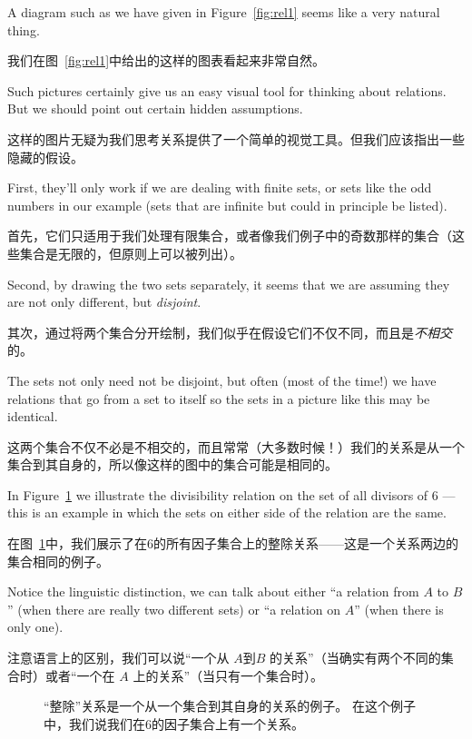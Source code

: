 A diagram such as we have given in Figure~\ref{fig:rel1} seems like a 
very natural thing.

我们在图~\ref{fig:rel1}中给出的这样的图表看起来非常自然。

Such pictures certainly give us an easy visual 
tool for thinking
about relations.  But we should point out certain hidden assumptions.

这样的图片无疑为我们思考关系提供了一个简单的视觉工具。但我们应该指出一些隐藏的假设。

First, they'll only work if we are dealing with finite sets, or sets
like the odd numbers in our example (sets that are infinite but could
in principle be listed).

首先，它们只适用于我们处理有限集合，或者像我们例子中的奇数那样的集合（这些集合是无限的，但原则上可以被列出）。

Second, by drawing the two sets separately,
it seems that we are assuming they are not only different, but 
\emph{disjoint}.

其次，通过将两个集合分开绘制，我们似乎在假设它们不仅不同，而且是\emph{不相交}的。

The sets not only need not be disjoint, but often
(most of the time!) we have relations that go from a set to itself
so the sets in a picture like this may be identical.

这两个集合不仅不必是不相交的，而且常常（大多数时候！）我们的关系是从一个集合到其自身的，所以像这样的图中的集合可能是相同的。

In Figure~\ref{fig:rel2}
we illustrate the divisibility relation on the set of all divisors of
6 --- this is an example in which the sets on either side of the relation
are the same.

在图~\ref{fig:rel2}中，我们展示了在6的所有因子集合上的整除关系——这是一个关系两边的集合相同的例子。

Notice the linguistic distinction, we can talk about
either ``a relation from $A$ to $B$'' (when there are really two 
different sets) or ``a relation on $A$'' (when there is only one).

注意语言上的区别，我们可以说“一个从 $A$到$B$ 的关系”（当确实有两个不同的集合时）或者“一个在 $A$ 上的关系”（当只有一个集合时）。

\begin{figure}[!hbtp]

\caption[An example of the ``divides'' relation.]{The ``divides'' relation %
is an example of a relation that goes from a set to itself.
In this example %
we say that we have a relation \emph{on} the set of divisors of 6.}
\caption[一个“整除”关系的例子。]{“整除”关系是一个从一个集合到其自身的关系的例子。
在这个例子中，我们说我们在6的因子集合上有一个关系。}
\label{fig:rel2} 
\end{figure}
 
